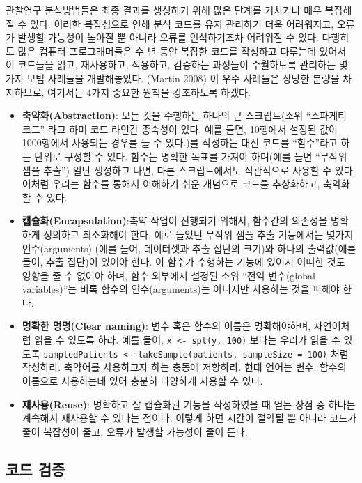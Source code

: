 \documentclass[11pt]{book}
\providecommand{\tightlist}{%
  \setlength{\itemsep}{0pt}\setlength{\parskip}{0pt}}
\theoremstyle{definition}
\theoremstyle{definition}
\theoremstyle{definition}
\theoremstyle{remark}
\begin{document}
관찰연구 분석방법들은 최종 결과를 생성하기 위해 많은 단계를 거치거나
매우 복잡해질 수 있다. 이러한 복잡성으로 인해 분석 코드를 유지 관리하기
더욱 어려워지고, 오류가 발생할 가능성이 높아질 뿐 아니라 오류를
인식하기조차 어려워질 수 있다. 다행히도 많은 컴퓨터 프로그래머들은 수 년
동안 복잡한 코드를 작성하고 다루는데 있어서 이 코드들을 읽고,
재사용하고, 적용하고, 검증하는 과정들이 수월하도록 관리하는 몇 가지 모범
사례들을 개발해놓았다. (Martin 2008) 이 우수 사례들은 상당한 분량을
차지하므로, 여기서는 4가지 중요한 원칙을 강조하도록 하겠다.

\begin{itemize}
\tightlist
\item
  \textbf{축약화(Abstraction)}: 모든 것을 수행하는 하나의 큰
  스크립트(소위 ``스파게티 코드'' 라고 하며 코드 라인간 종속성이 있다.
  예를 들면, 10행에서 설정된 값이 1000행에서 사용되는 경우를 들 수
  있다.)를 작성하는 대신 코드를 ``함수''라고 하는 단위로 구성할 수 있다.
  함수는 명확한 목표를 가져야 하며(예를 들면 ``무작위 샘플 추출'') 일단
  생성하고 나면, 다른 스크립트에서도 직관적으로 사용할 수 있다. 이처럼
  우리는 함수를 통해서 이해하기 쉬운 개념으로 코드를 추상화하고,
  축약화할 수 있다.
\item
  \textbf{캡슐화(Encapsulation)}:축약 작업이 진행되기 위해서, 함수간의
  의존성을 명확하게 정의하고 최소화해야 한다. 예로 들었던 무작위 샘플
  추출 기능에서는 몇가지 인수(arguments) (예를 들어, 데이터셋과 추출
  집단의 크기)와 하나의 출력값(예를 들어, 추출 집단)이 있어야 한다. 이
  함수가 수행하는 기능에 있어서 어떠한 것도 영향을 줄 수 없어야 하며,
  함수 외부에서 설정된 소위 ``전역 변수(global variables)''는 비록
  함수의 인수(arguments)는 아니지만 사용하는 것을 피해야 한다.
\item
  \textbf{명확한 명명(Clear naming)}: 변수 혹은 함수의 이름은
  명확해야하며, 자연어처럼 읽을 수 있도록 하라. 예를 들어,
  \texttt{x\ \textless{}-\ spl(y,\ 100)} 보다는 우리가 읽을 수 있도록
  \texttt{sampledPatients\ \textless{}-\ takeSample(patients,\ sampleSize\ =\ 100)}
  처럼 작성하라. 축약어를 사용하고자 하는 충동에 저항하라. 현대 언어는
  변수, 함수의 이름으로 사용하는데 있어 충분히 다양하게 사용할 수 있다.
\item
  \textbf{재사용(Reuse)}: 명확하고 잘 캡슐화된 기능을 작성하였을 때 얻는
  장점 중 하나는 계속해서 재사용할 수 있다는 점이다. 이렇게 하면 시간이
  절약될 뿐 아니라 코드가 줄어 복잡성이 줄고, 오류가 발생할 가능성이
  줄어 든다.
\end{itemize}

\subsection{코드 검증}\label{-}
\end{document}
